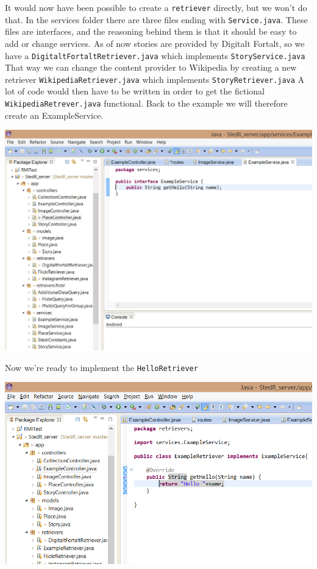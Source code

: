 It would now have been possible to create a \texttt{retriever} directly, but we won't do that. In the services folder there are three files ending with  \texttt{Service.java}. These files are interfaces, and the reasoning behind them is that it should be easy to add or change services. As of now stories are provided by Digitalt Fortalt, so we have a \texttt{DigitaltFortaltRetriever.java} which implements \texttt{StoryService.java} That way we can change the content provider to Wikipedia by creating a new retriever \texttt{WikipediaRetriever.java} which implements \texttt{StoryRetriever.java} A lot of code would then have to be written in order to get the fictional \texttt{WikipediaRetrever.java} functional. Back to the example we will therefore create an ExampleService. 

\begin{center}
\includegraphics[scale=0.7]{guide/eclipse4.png} 
\end{center}

Now we're ready to implement the \texttt{HelloRetriever}

\begin{center}
\includegraphics[scale=0.7]{guide/eclipse5.png} 
\end{center}

